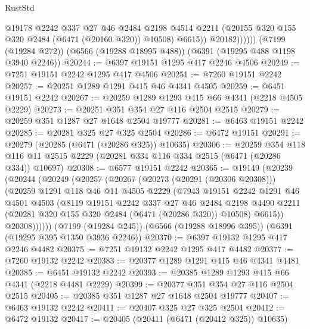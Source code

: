 \begin{lexlean}{RustStd}
\begin{coremodule}
                    @19178
                    @2242
                    @337
                    @27
                    @46
                    @2484
                    @2198
                    @4514
                    @2211
                    (@20155 @320 @155 @320 @2484 (@6471 (@20160 @320)) @10508)
                    @6615))
                @20182))))))
    (@7199 (@19284 @272))
    (@6566 (@19288 @18995 @488))
    (@6391 (@19295 @488 @1198 @3940 @2246))
@20244 := @6397 @19151 @1295 @417 @2246 @4506
@20249 := @7251 @19151 @2242 @1295 @417 @4506
@20251 := @7260 @19151 @2242
@20257 := @20251 @1289 @1291 @415 @46 @4341 @4505
@20259 := @6451 @19151 @2242
@20267 := @20259 @1289 @1293 @415 @66 @4341 (@2218 @4505 @2229)
@20273 := @20251 @351 @354 @27 @116 @2504 @2515
@20279 := @20259 @351 @1287 @27 @1648 @2504 @19777
@20281 := @6463 @19151 @2242
@20285 := @20281 @325 @27 @325 @2504
@20286 := @6472 @19151
@20291 := @20279 (@20285 (@6471 (@20286 @325)) @10635)
@20306 := @20259
    @354
    @118
    @116
    @11
    @2515
    @2229
    (@20281 @334 @116 @334 @2515 (@6471 (@20286 @334)) @10697)
@20308 := @6577 @19151 @2242
@20365 := @19149
    (@20239
      (@20244
        (@20249
          (@20257
            (@20267
              (@20273 (@20291 (@20306 @20308)))
              (@20259
                @1291
                @118
                @46
                @11
                @4505
                @2229
                (@7943
                  @19151
                  @2242
                  @1291
                  @46
                  @4501
                  @4503
                  (@8119
                    @19151
                    @2242
                    @337
                    @27
                    @46
                    @2484
                    @2198
                    @4490
                    @2211
                    (@20281 @320 @155 @320 @2484 (@6471 (@20286 @320)) @10508)
                    @6615))
                @20308))))))
    (@7199 (@19284 @245))
    (@6566 (@19288 @18996 @395))
    (@6391 (@19295 @395 @1350 @3936 @2246))
@20370 := @6397 @19132 @1295 @417 @2246 @4482
@20375 := @7251 @19132 @2242 @1295 @417 @4482
@20377 := @7260 @19132 @2242
@20383 := @20377 @1289 @1291 @415 @46 @4341 @4481
@20385 := @6451 @19132 @2242
@20393 := @20385 @1289 @1293 @415 @66 @4341 (@2218 @4481 @2229)
@20399 := @20377 @351 @354 @27 @116 @2504 @2515
@20405 := @20385 @351 @1287 @27 @1648 @2504 @19777
@20407 := @6463 @19132 @2242
@20411 := @20407 @325 @27 @325 @2504
@20412 := @6472 @19132
@20417 := @20405 (@20411 (@6471 (@20412 @325)) @10635)

\end{coremodule}
\end{lexlean}
